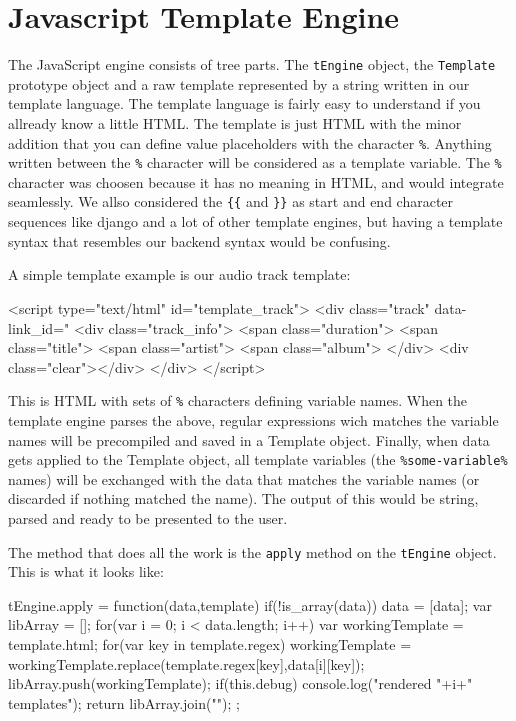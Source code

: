 \section{Javascript Template Engine}

The JavaScript engine consists of tree parts. The 
\lstinline$tEngine$ object, the \lstinline$Template$ prototype object 
and a raw template represented by a string written in our template language. 
The template language is fairly easy to understand if you allready know a little HTML. 
The template is just HTML with the minor addition that you can define value placeholders with the character \verb$%$. 
Anything written between the \verb$%$ character will be considered as a template variable. 
The \verb$%$ character was choosen because it has no meaning in HTML, and would integrate seamlessly. 
We allso considered the \verb${{$ and \verb$}}$ as start and end character 
sequences like django and a lot of other template engines, 
but having a template syntax that resembles our backend syntax would be confusing.

A simple template example is our audio track template:

\begin{snippet}[language=HTML,caption=The template used to represent audio tracks]
<script type="text/html" id="template_track">
	<div class="track" data-link_id="%
		<div class="track_info">
			<span class="duration">%
			<span class="title">%
			<span class="artist">%
			<span class="album">%
		</div>
		<div class="clear"></div>
	</div>
</script>
\end{snippet}
 
This is HTML with sets of \verb$%$ characters defining variable names. 
When the template engine parses the above, regular expressions wich matches the variable names will be precompiled and saved in a Template object. 
Finally, when data gets applied to the Template object, 
all template variables (the \verb$%some-variable%$ names) will be exchanged with 
the data that matches the variable names (or discarded if nothing matched the name).
The output of this would be string, parsed and ready to be presented to the user.


The method that does all the work is the \verb$apply$ method on the \verb$tEngine$ object. This is what it looks like:

\begin{snippet}[language=JavaScript,caption=The javascript engine apply method]
tEngine.apply = function(data,template) {
    if(!is_array(data)) {
        data = [data];
    }
    var libArray = [];
    for(var i = 0; i < data.length; i++) {
        var workingTemplate = template.html;
        for(var key in template.regex) {
            workingTemplate = workingTemplate.replace(template.regex[key],data[i][key]);
        }
        libArray.push(workingTemplate);
    }
	if(this.debug) {
		console.log("rendered "+i+" templates");
	}
    return libArray.join("\n");
};
\end{snippet}

